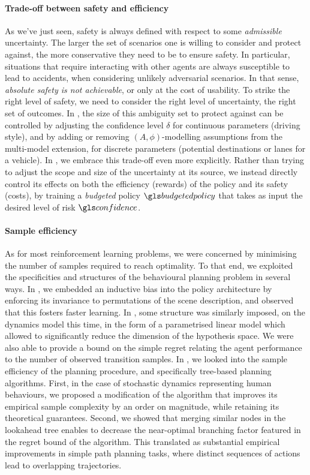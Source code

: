 \paragraph{Trade-off between safety and efficiency}
As we've just seen, safety is always defined with respect to some \emph{admissible} uncertainty. The larger the set of scenarios one is willing to consider and protect against, the more conservative they need to be to ensure safety. In particular, situations that require interacting with other agents are always susceptible to lead to accidents, when considering unlikely adversarial scenarios. In that sense, \emph{absolute safety is not achievable}, or only at the cost of usability. To strike the right level of safety, we need to consider the right level of uncertainty, the right set of outcomes. In , the size of this ambiguity set to protect against can be controlled by adjusting the confidence level $\delta$ for continuous parameters (\eg driving style), and by adding or removing $(A,\phi)$-modelling assumptions from the multi-model extension, for discrete parameters (\eg potential destinations or lanes for a vehicle). In , we embrace this trade-off even more explicitly. Rather than trying to adjust the scope and size of the uncertainty at its source, we instead directly control its effects on both the efficiency (rewards) of the policy and its safety (costs), by training a \emph{budgeted} policy $\budgetedpolicy$ that takes as input the desired level of risk $\confidence$.

\paragraph{Sample efficiency}
As for most reinforcement learning problems, we were concerned by minimising the number of samples required to reach optimality. To that end, we exploited the specificities and structures of the behavioural planning problem in several ways. In , we embedded an inductive bias into the policy architecture by enforcing its invariance to permutations of the scene description, and observed that this fosters faster learning. In , some structure was similarly imposed, on the dynamics model this time, in the form of a parametrised linear model which allowed to significantly reduce the dimension of the hypothesis space. We were also able to provide a bound on the simple regret relating the agent performance to the number of observed transition samples. In , we looked into the sample efficiency of the planning procedure, and specifically tree-based planning algorithms. First, in the case of stochastic dynamics representing human behaviours, we proposed a modification of the \OLOP algorithm that improves its empirical sample complexity by an order on magnitude, while retaining its theoretical guarantees. Second, we showed that merging similar nodes in the lookahead tree enables to decrease the near-optimal branching factor featured in the regret bound of the algorithm. This translated as substantial empirical improvements in simple path planning tasks, where distinct sequences of actions lead to overlapping trajectories.


